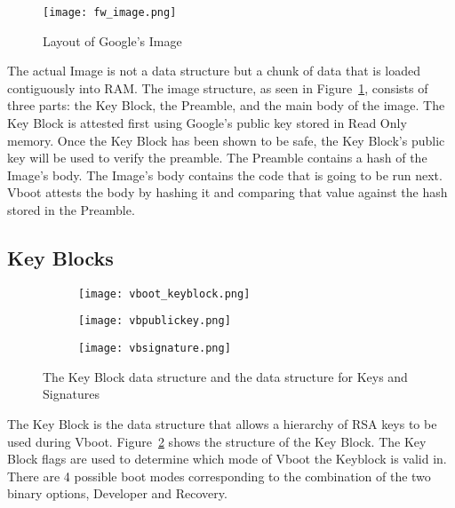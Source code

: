 \begin{figure}
    \centering
    \texttt{[image: fw\_image.png]}
    \caption[Google's Image Data Layout]{Layout of Google's Image~\cite{vboot-data-structures}}
    \label{fig:vboot_images}
\end{figure}

The actual Image is not a data structure but a chunk of data that is loaded
contiguously into RAM\@.
The image structure, as seen in Figure~\ref{fig:vboot_images}, consists of three
parts: the Key Block, the Preamble, and the main body of the image.
The Key Block is attested first using Google's public key stored in Read Only memory.
Once the Key Block has been shown to be safe, the Key Block's public key will be used to verify the preamble.
The Preamble contains a hash of the Image's body.
The Image's body contains the code that is going to be run next.
Vboot attests the body by hashing it and comparing that value against the hash
stored in the Preamble.

\subsection{Key Blocks}\label{sec:key_block}

\begin{figure}
\begin{subfigure}{.5\textwidth}
  \centering
  \texttt{[image: vboot\_keyblock.png]}
\end{subfigure}
\begin{subfigure}{.20\textwidth}
  \centering
  \texttt{[image: vbpublickey.png]}
\end{subfigure}
\begin{subfigure}{.20\textwidth}
  \centering
  \texttt{[image: vbsignature.png]}
\end{subfigure}
\caption[Key Block Data Structure]{The Key Block data structure and the data
structure for Keys and Signatures}
\label{fig:vboot_keyblock}
\end{figure}

The Key Block is the data structure that allows a hierarchy of RSA keys to be used during Vboot.
Figure~\ref{fig:vboot_keyblock} shows the structure of the Key Block. 
The Key Block flags are used to determine which mode of Vboot the Keyblock is valid in. 
There are 4 possible boot modes corresponding to the combination of the two binary options, Developer and Recovery.

